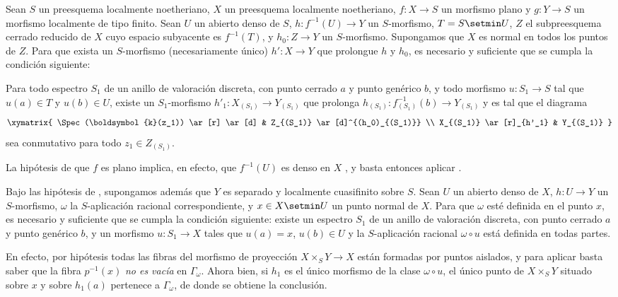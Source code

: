 \begin{corollary}[20.4.9]
\label{IV.20.4.9}
Sean $S$ un preesquema localmente noetheriano, $X$ un preesquema localmente noetheriano, $f:X\to S$ un morfismo plano y $g:Y\to S$ un morfismo localmente de tipo finito.
Sean $U$ un abierto denso de $S$, $h:f^{-1}(U)\to Y$ un $S$-morfismo, $T=S\setmin U$, $Z$ el subpreesquema cerrado reducido de $X$ cuyo espacio subyacente es $f^{-1}(T)$, y $h_0:Z\to Y$ un $S$-morfismo.
Supongamos que $X$ es \textup{normal} en todos los puntos de $Z$.
Para que exista un $S$-morfismo (necesariamente único) $h':X\to Y$ que prolongue $h$ y $h_0$, es necesario y suficiente que se cumpla la condición siguiente:

Para todo espectro $S_1$ de un anillo de valoración discreta, con punto cerrado $a$ y punto genérico $b$, y todo morfismo $u:S_1\to S$ tal que $u(a)\in T$ y $u(b)\in U$, existe un $S_1$-morfismo $h'_1:X_{(S_1)}\to Y_{(S_1)}$ que prolonga $h_{(S_1)}:f_{(S_1)}^{-1}(b)\to Y_{(S_1)}$ y es tal que el diagrama
\[
  \xymatrix{
  \Spec(\boldsymbol{k}(z_1)) \ar[r] \ar[d] & Z_{(S_1)} \ar[d]^{(h_0)_{(S_1)}} \\
  X_{(S_1)} \ar[r]_{h'_1} & Y_{(S_1)}
  }
\]
sea conmutativo para todo $z_1\in Z_{(S_1)}$.

La hipótesis de que $f$ es plano implica, en efecto, que $f^{-1}(U)$ es denso en $X$ , y basta entonces aplicar .
\end{corollary}

\begin{corollary}[20.4.10]
\label{IV.20.4.10}
Bajo las hipótesis de , supongamos además que $Y$ es separado y localmente cuasifinito sobre $S$.
Sean $U$ un abierto denso de $X$, $h:U\to Y$ un $S$-morfismo, $\omega$ la $S$-aplicación racional correspondiente, y $x\in X\setmin U$ un punto \textup{normal} de $X$.
Para que $\omega$ esté definida en el punto $x$, es necesario y suficiente que se cumpla la condición siguiente: existe un espectro $S_1$ de un anillo de valoración discreta, con punto cerrado $a$ y punto genérico $b$, y un morfismo $u:S_1\to X$
tales que $u(a)=x$, $u(b)\in U$ y la $S$-aplicación racional $\omega\circ u$ está definida en todas partes.

En efecto, por hipótesis todas las fibras del morfismo de proyección $X\times_S Y\to X$ están formadas por puntos aislados, y para aplicar  basta saber que la fibra $p^{-1}(x)$ \emph{no es vacía} en $\Gamma_\omega$.
Ahora bien, si $h_1$ es el único morfismo de la clase $\omega\circ u$, el único punto de $X\times_S Y$ situado sobre $x$ y sobre $h_1(a)$ pertenece a $\Gamma_\omega$, de donde se obtiene la conclusión.
\end{corollary}

